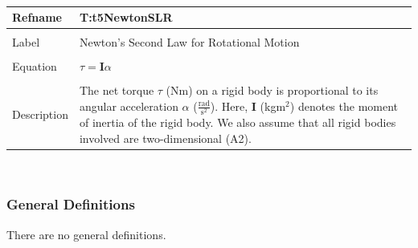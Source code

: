 \documentclass[12pt]{article}
\begin{document}
~\newline
\noindent \begin{minipage}{\textwidth}
\begin{tabular}{p{} p{}}
\toprule \textbf{Refname} & \textbf{T:t5NewtonSLR}
\label{T:t5NewtonSLR}
\\ \midrule \\
Label & Newton's Second Law for Rotational Motion
\\ \midrule \\
Equation & $τ=\mathbf{I} α$
\\ \midrule \\
Description & The net torque $τ$ (Nm) on a rigid body is proportional to its angular acceleration $α$ ($\frac{\text{rad}}{\text{s}^{2}}$). Here, $\mathbf{I}$ (kg$\text{m}^{2}$) denotes the moment of inertia of the rigid body. We also assume that all rigid bodies involved are two-dimensional (A2).
\\ \bottomrule \end{tabular}
\end{minipage}\\
\subsubsection{General Definitions}
\label{Sec:GDs}
There are no general definitions.
\end{document}

